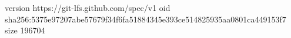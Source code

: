 version https://git-lfs.github.com/spec/v1
oid sha256:5375e97207abe57679f34f6fa51884345e393ce514825935aa0801ca449153f7
size 196704
